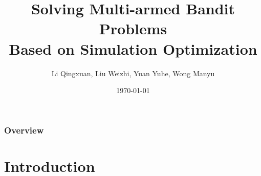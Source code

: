 \documentclass[compress]{beamer}
\title[IE5504 Project]{Solving Multi-armed Bandit Problems \\ Based on Simulation Optimization} %
\author{Li Qingxuan, Liu Weizhi, Yuan Yuhe, Wong Manyu} %
\institute[NUS ISE] %
{
Department of Industrial \& Systems Engineering \\ National University of Singapore \\ %
\medskip
}
\date{\today} %
\begin{document}
\small

\begin{frame}
\titlepage %
\end{frame}

\begin{frame}
\frametitle{Overview} %
\tableofcontents %
\end{frame}


\section{Introduction}
\end{document}
